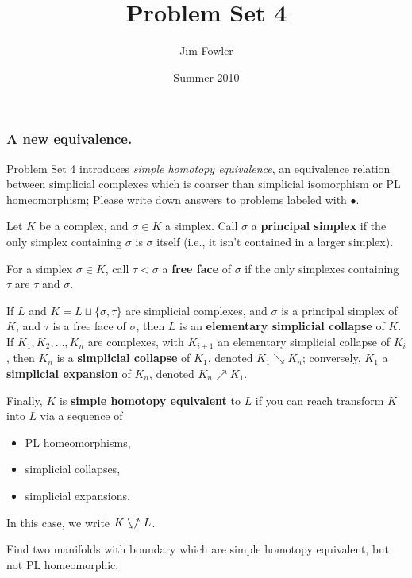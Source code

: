 \documentclass[12pt]{pset}
\title{Problem Set 4}
\author{Jim Fowler}
\date{Summer 2010}
\newcommand{\collapses}{\searrow}
\newcommand{\expands}{\nearrow}
\newcommand{\she}{\ssearrow\nnearrow}
\begin{document}
\maketitle

\subsubsection*{A new equivalence.} Problem Set 4 introduces
\textit{simple homotopy equivalence}, an equivalence relation between
simplicial complexes which is coarser than simplicial isomorphism or PL
homeomorphism; Please write down answers to problems labeled
  with $\bullet$.


 \begin{definition*}
   Let $K$ be a complex, and $\sigma \in K$ a simplex. Call $\sigma$ a
   \textbf{principal simplex} if the only simplex containing $\sigma$
   is $\sigma$ itself (i.e., it isn't contained in a larger simplex).

   For a simplex $\sigma \in K$, call $\tau < \sigma$ a \textbf{free
     face} of $\sigma$ if the only simplexes containing $\tau$ are
   $\tau$ and $\sigma$.

   If $L$ and $K = L \sqcup \{ \sigma, \tau \}$ are simplicial
   complexes, and $\sigma$ is a principal simplex of $K$, and $\tau$
   is a free face of $\sigma$, then $L$ is an \textbf{elementary
     simplicial collapse} of $K$.  If $K_1, K_2, \ldots, K_n$ are
   complexes, with $K_{i+1}$ an elementary simplicial collapse of
   $K_i$, then $K_n$ is a \textbf{simplicial collapse} of $K_1$,
   denoted $K_1 \collapses K_n$; conversely, $K_1$ a
   \textbf{simplicial expansion} of $K_n$, denoted $K_n \expands K_1$.

   Finally, $K$ is \textbf{simple homotopy equivalent} to $L$ if you can reach transform $K$ into $L$ via a sequence of
    \begin{itemize}
    \item PL homeomorphisms,
    \item simplicial collapses,
    \item simplicial expansions.
    \end{itemize}
    In this case, we write $K \she L$.
\end{definition*}

\begin{requiredproblem}
  Find two manifolds with boundary which are simple homotopy
  equivalent, but not PL homeomorphic.
\end{requiredproblem}
\end{document}
